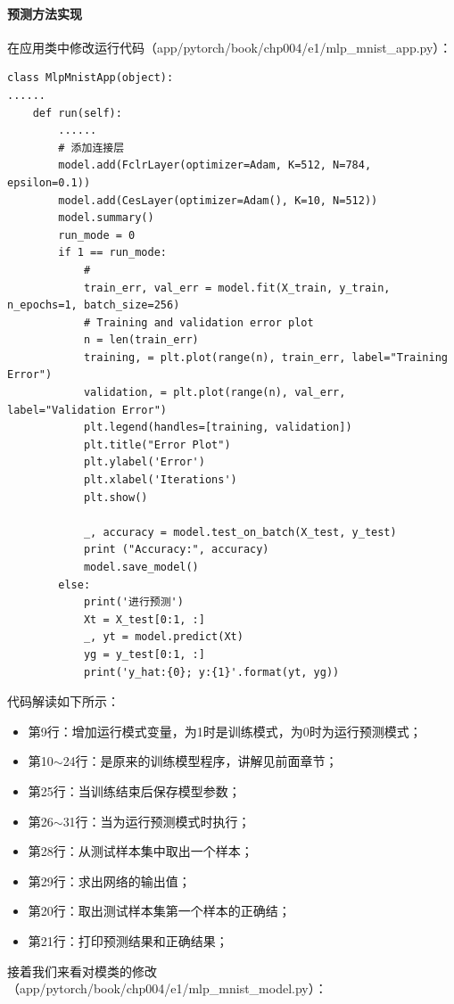 \documentclass[UTF8]{article}
\begin{document}
\paragraph{预测方法实现}
在应用类中修改运行代码（app/pytorch/book/chp004/e1/mlp\_mnist\_app.py）：
\begin{lstlisting}
class MlpMnistApp(object):
......
    def run(self):
    	......
        # 添加连接层
        model.add(FclrLayer(optimizer=Adam, K=512, N=784, epsilon=0.1))
        model.add(CesLayer(optimizer=Adam(), K=10, N=512))
        model.summary()
        run_mode = 0
        if 1 == run_mode:
            #
            train_err, val_err = model.fit(X_train, y_train, n_epochs=1, batch_size=256)
            # Training and validation error plot
            n = len(train_err)
            training, = plt.plot(range(n), train_err, label="Training Error")
            validation, = plt.plot(range(n), val_err, label="Validation Error")
            plt.legend(handles=[training, validation])
            plt.title("Error Plot")
            plt.ylabel('Error')
            plt.xlabel('Iterations')
            plt.show()

            _, accuracy = model.test_on_batch(X_test, y_test)
            print ("Accuracy:", accuracy)
            model.save_model()
        else:
            print('进行预测')
            Xt = X_test[0:1, :]
            _, yt = model.predict(Xt)
            yg = y_test[0:1, :]
            print('y_hat:{0}; y:{1}'.format(yt, yg))
\end{lstlisting}
代码解读如下所示：
\begin{itemize}
\item 第9行：增加运行模式变量，为1时是训练模式，为0时为运行预测模式；
\item 第10$\sim$24行：是原来的训练模型程序，讲解见前面章节；
\item 第25行：当训练结束后保存模型参数；
\item 第26$\sim$31行：当为运行预测模式时执行；
\item 第28行：从测试样本集中取出一个样本；
\item 第29行：求出网络的输出值；
\item 第20行：取出测试样本集第一个样本的正确结；
\item 第21行：打印预测结果和正确结果；
\end{itemize}
接着我们来看对模类的修改（app/pytorch/book/chp004/e1/mlp\_mnist\_model.py）：
\end{document}
